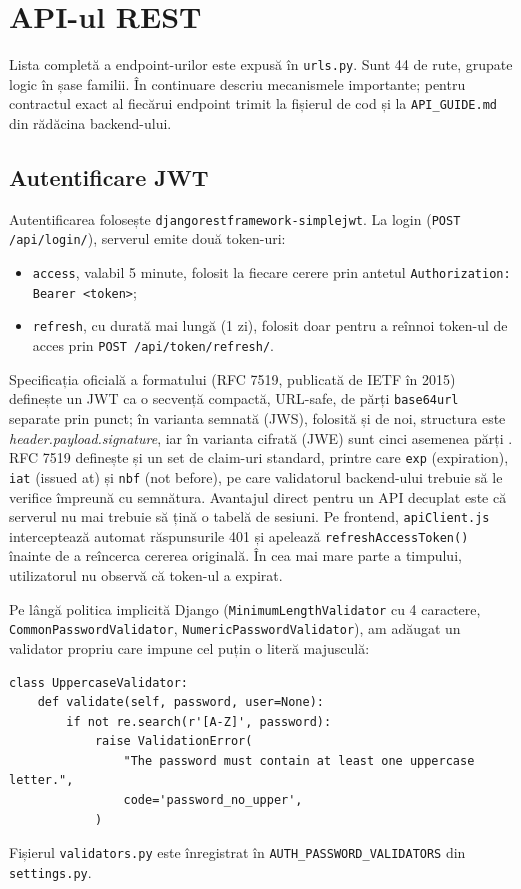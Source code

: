 \section{API-ul REST}
Lista completă a endpoint-urilor este expusă în \texttt{urls.py}. Sunt 44 de rute, grupate logic în șase familii. În continuare descriu mecanismele importante; pentru contractul exact al fiecărui endpoint trimit la fișierul de cod și la \texttt{API\_GUIDE.md} din rădăcina backend-ului.

\subsection{Autentificare JWT}
Autentificarea folosește \texttt{djangorestframework-simplejwt}. La login (\texttt{POST /api/login/}), serverul emite două token-uri:
\begin{itemize}
    \item \texttt{access}, valabil 5 minute, folosit la fiecare cerere prin antetul \texttt{Authorization: Bearer <token>};
    \item \texttt{refresh}, cu durată mai lungă (1 zi), folosit doar pentru a reînnoi token-ul de acces prin \texttt{POST /api/token/refresh/}.
\end{itemize}
Specificația oficială a formatului (RFC 7519, publicată de IETF în 2015) definește un JWT ca o secvență compactă, URL-safe, de părți \texttt{base64url} separate prin punct; în varianta semnată (JWS), folosită și de noi, structura este \emph{header.payload.signature}, iar în varianta cifrată (JWE) sunt cinci asemenea părți \cite{rfc_jwt}. RFC 7519 definește și un set de claim-uri standard, printre care \texttt{exp} (expiration), \texttt{iat} (issued at) și \texttt{nbf} (not before), pe care validatorul backend-ului trebuie să le verifice împreună cu semnătura. Avantajul direct pentru un API decuplat este că serverul nu mai trebuie să țină o tabelă de sesiuni. Pe frontend, \texttt{apiClient.js} interceptează automat răspunsurile 401 și apelează \texttt{refreshAccessToken()} înainte de a reîncerca cererea originală. În cea mai mare parte a timpului, utilizatorul nu observă că token-ul a expirat.

Pe lângă politica implicită Django (\texttt{MinimumLength}\-\texttt{Validator} cu 4 caractere, \texttt{CommonPassword}\-\texttt{Validator}, \texttt{NumericPassword}\-\texttt{Validator}), am adăugat un validator propriu care impune cel puțin o literă majusculă:
\begin{verbatim}
class UppercaseValidator:
    def validate(self, password, user=None):
        if not re.search(r'[A-Z]', password):
            raise ValidationError(
                "The password must contain at least one uppercase letter.",
                code='password_no_upper',
            )
\end{verbatim}
Fișierul \texttt{validators.py} este înregistrat în \texttt{AUTH\_PASSWORD\_VALIDATORS} din \texttt{settings.py}.

